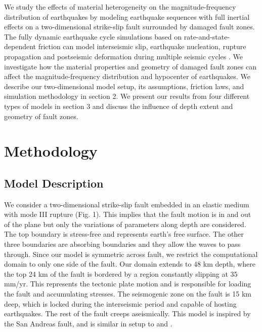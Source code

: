\documentclass[11pt]{article}
\begin{document}
We study the effects of material heterogeneity on the magnitude-frequency distribution of earthquakes by modeling earthquake sequences with full inertial effects on a two-dimensional strike-slip fault surrounded by damaged fault zones. The fully dynamic earthquake cycle simulations based on rate-and-state-dependent friction can model interseismic slip, earthquake nucleation, rupture propagation and postseismic deformation during multiple seismic cycles \citep{lapusta_2000, kaneko_2011, barbot_2012, jiang_lapusta_2016}. We investigate how the material properties and geometry of damaged fault zones can affect the magnitude-frequency distribution and hypocenter of earthquakes. We describe our two-dimensional model setup, its assumptions, friction laws, and simulation methodology in section 2. We present our results from four different types of models in section 3 and discuss the influence of depth extent and geometry of fault zones.



\section{Methodology}
\subsection{Model Description}
We consider a two-dimensional strike-slip fault embedded in an elastic medium with mode III rupture (Fig. 1). This implies that the fault motion is in and out of the plane but only the variations of parameters along depth are considered. The top boundary is stress-free and represents earth’s free surface. The other three boundaries are absorbing boundaries and they allow the waves to pass through. Since our model is symmetric across fault, we restrict the computational domain to only one side of the fault. Our domain extends to 48 km depth, where the top 24 km of the fault is bordered by a region constantly slipping at 35 mm/yr. This represents the tectonic plate motion and is responsible for loading the fault and accumulating stresses. The seismogenic zone on the fault is 15 km deep, which is locked during the interseismic period and capable of hosting earthquakes. The rest of the fault creeps aseismically. This model is inspired by the San Andreas fault, and is similar in setup to \citet{lapusta_2000} and \citet{kaneko_2011}.
\end{document}
